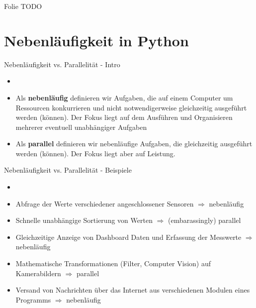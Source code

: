 \begin{frame}{Folie}
    TODO
\end{frame}

\section{Nebenläufigkeit in Python}

\begin{frame}{Nebenläufigkeit vs. Parallelität - Intro}
        \begin{itemize}
        \setlength{\itemindent}{2.0in}
        \item [\textbf{Definition: Nebenläufig vs. Parallel}]
    \end{itemize}

    \begin{itemize}
        \item Als \textbf{nebenläufig} definieren wir Aufgaben, die auf einem Computer um Ressourcen konkurrieren und nicht notwendigerweise gleichzeitig ausgeführt werden (können). Der Fokus liegt auf dem Ausführen und Organisieren mehrerer eventuell unabhängiger Aufgaben
        \item Als \textbf{parallel} definieren wir nebenläufige Aufgaben, die gleichzeitig ausgeführt werden (können). Der Fokus liegt aber auf Leistung.
     \end{itemize}
\end{frame}

\begin{frame}{Nebenläufigkeit vs. Parallelität - Beispiele}
        \begin{itemize}
        \setlength{\itemindent}{2.2in}
        \item [\textbf{Beispiele: Nebenläufig oder Parallel?}]
    \end{itemize}

    \begin{itemize}
        \item Abfrage der Werte verschiedener angeschlossener Sensoren $\Rightarrow$ nebenläufig
        \item Schnelle unabhängige Sortierung von Werten $\Rightarrow$ (embarassingly) parallel
        \item Gleichzeitige Anzeige von Dashboard Daten und Erfassung der Messwerte $\Rightarrow$ nebenläufig
        \item Mathematische Transformationen (Filter, Computer Vision) auf Kamerabildern  $\Rightarrow$ parallel %
        \item Versand von Nachrichten über das Internet aus verschiedenen Modulen eines Programms  $\Rightarrow$ nebenläufig
     \end{itemize}
\end{frame}


